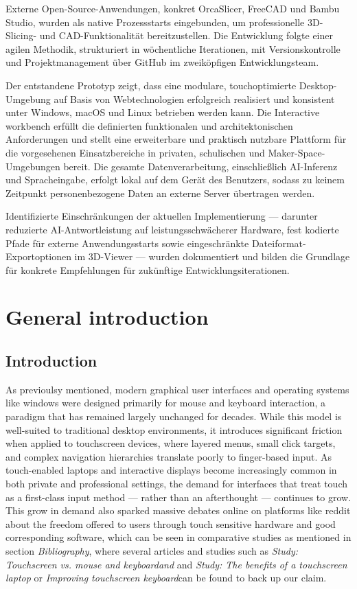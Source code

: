 \documentclass[a4paper,12pt]{article}
\begin{document}
Externe Open-Source-Anwendungen, konkret OrcaSlicer, FreeCAD und Bambu Studio, wurden als native Prozessstarts eingebunden, um professionelle 3D-Slicing- und CAD-Funktionalität bereitzustellen. Die Entwicklung folgte einer agilen Methodik, strukturiert in wöchentliche Iterationen, mit Versionskontrolle und Projektmanagement über GitHub im zweiköpfigen Entwicklungsteam.

Der entstandene Prototyp zeigt, dass eine modulare, touchoptimierte Desktop-Umgebung auf Basis von Webtechnologien erfolgreich realisiert und konsistent unter Windows, macOS und Linux betrieben werden kann. Die Interactive workbench erfüllt die definierten funktionalen und architektonischen Anforderungen und stellt eine erweiterbare und praktisch nutzbare Plattform für die vorgesehenen Einsatzbereiche in privaten, schulischen und Maker-Space-Umgebungen bereit. Die gesamte Datenverarbeitung, einschließlich AI-Inferenz und Spracheingabe, erfolgt lokal auf dem Gerät des Benutzers, sodass zu keinem Zeitpunkt personenbezogene Daten an externe Server übertragen werden. 

Identifizierte Einschränkungen der aktuellen Implementierung — darunter reduzierte AI-Antwortleistung auf leistungsschwächerer Hardware, fest kodierte Pfade für externe Anwendungsstarts sowie eingeschränkte Dateiformat-Exportoptionen im 3D-Viewer — wurden dokumentiert und bilden die Grundlage für konkrete Empfehlungen für zukünftige Entwicklungsiterationen.

\section{General introduction}
\subsection{Introduction}
As previoulsy mentioned, modern graphical user interfaces and operating systems like windows were designed primarily for mouse and keyboard interaction, a paradigm that has remained largely unchanged for decades. 
While this model is well-suited to traditional desktop environments, it introduces significant friction when applied to touchscreen devices, where layered menus, small click targets, and complex navigation hierarchies translate poorly to finger-based input. As touch-enabled laptops and interactive displays become increasingly common in both private and professional settings, the demand for interfaces that treat touch as a first-class input method — rather than an afterthought — continues to grow.
This grow in demand also sparked massive debates online on platforms like reddit about the freedom offered to users through touch sensitive hardware and good corresponding software, which can be seen in comparative studies
as mentioned in section \textit{Bibliography}, where several articles and studies such as \textit{Study: Touchscreen vs. mouse and keyboardand}\cite{Study: Touchscreen vs. mouse and keyboard}  and  \textit{Study: The benefits of a touchscreen laptop}\cite{Study: The benefits of a touchscreen laptop} or \textit{Improving touchscreen keyboard}\cite{Study: Improving touchscreen keyboards}can be found to back up our claim. 
\end{document}
